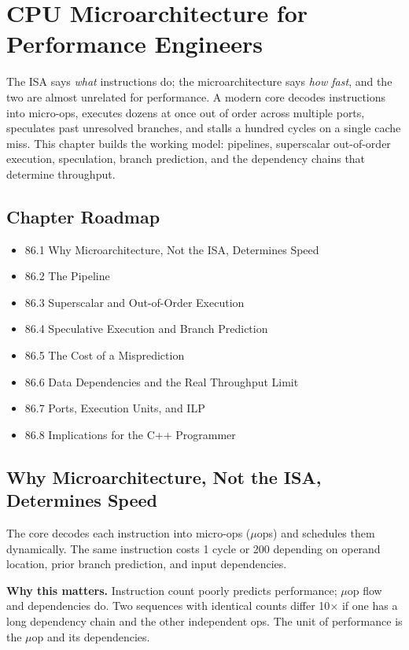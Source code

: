 \chapter{CPU Microarchitecture for Performance Engineers}

The ISA says \emph{what} instructions do; the microarchitecture says \emph{how fast}, and the two are almost unrelated for performance. A modern core decodes instructions into micro-ops, executes dozens at once out of order across multiple ports, speculates past unresolved branches, and stalls a hundred cycles on a single cache miss. This chapter builds the working model: pipelines, superscalar out-of-order execution, speculation, branch prediction, and the dependency chains that determine throughput.

\section*{Chapter Roadmap}
\begin{itemize}
\item 86.1 Why Microarchitecture, Not the ISA, Determines Speed
\item 86.2 The Pipeline
\item 86.3 Superscalar and Out-of-Order Execution
\item 86.4 Speculative Execution and Branch Prediction
\item 86.5 The Cost of a Misprediction
\item 86.6 Data Dependencies and the Real Throughput Limit
\item 86.7 Ports, Execution Units, and ILP
\item 86.8 Implications for the C++ Programmer
\end{itemize}

\section{Why Microarchitecture, Not the ISA, Determines Speed}
The core decodes each instruction into micro-ops (\(\mu\)ops) and schedules them dynamically. The same instruction costs 1 cycle or 200 depending on operand location, prior branch prediction, and input dependencies.

\textbf{Why this matters.} Instruction count poorly predicts performance; \(\mu\)op flow and dependencies do. Two sequences with identical counts differ 10$\times$ if one has a long dependency chain and the other independent ops. The unit of performance is the \(\mu\)op and its dependencies.

